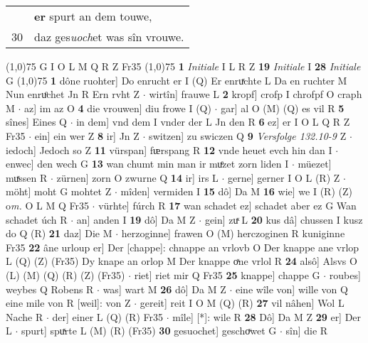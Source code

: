 \documentclass[8pt,a4paper,notitlepage]{article}
\begin{document}
\begin{table}[ht]
\begin{minipage}[t]{0.5\linewidth}
\begin{tabular}{rl}
 & \textbf{er} spurt an dem touwe,\\ 
30 & daz ges\textit{uoch}et was sîn vrouwe.\\ 
\end{tabular}
\scriptsize
\line(1,0){75} \newline
G I O L M Q R Z Fr35 \newline
\line(1,0){75} \newline
\textbf{1} \textit{Initiale} I L R Z  \textbf{19} \textit{Initiale} I  \textbf{28} \textit{Initiale} G  \newline
\line(1,0){75} \newline
\textbf{1} dône ruohter] Do enrucht er I (Q) Er enruͯchte L Da en ruchter M Nun enruͦchet Jn R Ern rvht Z  $\cdot$ wirtîn] frauwe L \textbf{2} kropf] crofp I chrofpf O craph M  $\cdot$ az] im az O \textbf{4} die vrouwen] diu frowe I (Q)  $\cdot$ gar] al O (M) (Q) es vil R \textbf{5} sînes] Eines Q  $\cdot$ in dem] vnd dem I vnder der L Jn den R \textbf{6} ez] er I O L Q R Z Fr35  $\cdot$ ein] ein wer Z \textbf{8} ir] Jn Z  $\cdot$ switzen] zu swiczen Q \textbf{9} \textit{Versfolge 132.10-9} Z   $\cdot$ iedoch] Jedoch so Z \textbf{11} vürspan] fᵫrspang R \textbf{12} vnde heuet evch hin dan I  $\cdot$ enwec] den wech G \textbf{13} wan chumt min man ir muͤzet zorn liden I  $\cdot$ müezet] muͯssen R  $\cdot$ zürnen] zorn O zwurne Q \textbf{14} ir] irs L  $\cdot$ gerne] gerner I O L (R) Z  $\cdot$ möht] moht G mohtet Z  $\cdot$ mîden] vermiden I \textbf{15} dô] Da M \textbf{16} wie] we I (R) (Z) o\textit{m. } O L M Q Fr35  $\cdot$ vürhte] fúrch R \textbf{17} wan schadet ez] schadet aber ez G Wan schadet úch R  $\cdot$ an] anden I \textbf{19} dô] Da M Z  $\cdot$ gein] zuͯ L \textbf{20} kus dâ] chussen I kusz do Q (R) \textbf{21} daz] Die M  $\cdot$ herzoginne] frawen O (M) herczoginen R kuniginne Fr35 \textbf{22} âne urloup er] Der [chappe]: chnappe an vrlovb O Der knappe ane vrlop L (Q) (Z) (Fr35) Dy knape an orlop M Der knappe oͯne vrlol R \textbf{24} alsô] Alsvs O (L) (M) (Q) (R) (Z) (Fr35)  $\cdot$ riet] riet mir Q Fr35 \textbf{25} knappe] chappe G  $\cdot$ roubes] weybes Q Robens R  $\cdot$ was] wart M \textbf{26} dô] Da M Z  $\cdot$ eine wîle von] wille von Q eine mile von R [weil]: von Z  $\cdot$ gereit] reit I O M (Q) (R) \textbf{27} vil nâhen] Wol L Nache R  $\cdot$ der] einer L (Q) (R) Fr35  $\cdot$ mîle] [*]: wile R \textbf{28} Dô] Da M Z \textbf{29} er] Der L  $\cdot$ spurt] spuͯrte L (M) (R) (Fr35) \textbf{30} gesuochet] geschoͮwet G  $\cdot$ sîn] die R \newline
\end{minipage}

\end{table}
\end{document}
